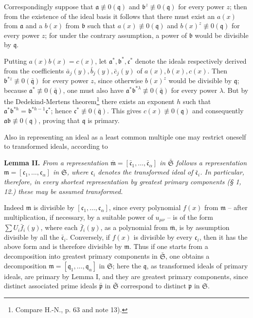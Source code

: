 \documentclass[11pt]{article}
\providecommand{\frakS}{\mathfrak S}
\providecommand{\frakm}{\mathfrak m}
\providecommand{\frakp}{\mathfrak p}
\providecommand{\frakq}{\mathfrak q}
\providecommand{\fraka}{\mathfrak a}
\providecommand{\frakb}{\mathfrak b}
\providecommand{\frakc}{\mathfrak c}
\providecommand{\barfrakm}{\overline{\mathfrak m}}
\providecommand{\fraka}{\mathfrak a}
\providecommand{\frakc}{\mathfrak c}
\providecommand{\frakp}{\mathfrak p}
\providecommand{\frakp}{\mathfrak p}
\providecommand{\frakq}{\mathfrak q}
\providecommand{\frakS}{\mathfrak S}
\begin{document}
Correspondingly suppose that $\fraka\not\equiv0(\frakq)$ and $\frakb^z\not\equiv0(\frakq)$ for every power $z$; then from the existence of the ideal basis it follows that there must exist an $a(x)$ from $\fraka$ and a $b(x)$ from $\frakb$ such that $a(x)\not\equiv0(\frakq)$ and $b(x)^z\not\equiv0(\frakq)$ for every power $z$; for under the contrary assumption, a power of $\frakb$ would be divisible by $\frakq$.

Putting $a(x)b(x)=c(x)$, let $\fraka^*,\frakb^*,\frakc^*$ denote the ideals respectively derived from the coefficients $\bar a_j(y),\bar b_j(y),\bar c_j(y)$ of $a(x),b(x),c(x)$. Then $\frakb^{*z}\not\equiv0(\bar{\frakq})$ for every power $z$, since otherwise $b(x)^z$ would be divisible by $\frakq$; because $\fraka^*\not\equiv0(\bar{\frakq})$, one must also have $\fraka^*\frakb^{*\lambda}\not\equiv0(\bar{\frakq})$ for every power $\lambda$. But by the Dedekind-Mertens theorem\footnote{Compare H.-N., p. 63 and note 13).} there exists an exponent $h$ such that $\fraka^*\frakb^{*h}=\frakb^{*h-1}\frakc^*$; hence $\frakc^*\not\equiv0(\bar{\frakq})$. This gives $c(x)\not\equiv0(\frakq)$ and consequently $\fraka\frakb\not\equiv0(\frakq)$, proving that $\frakq$ is primary.

Also in representing an ideal as a least common multiple one may restrict oneself to transformed ideals, according to

\textbf{Lemma II.} \emph{From a representation $\barfrakm=[\bar{\frakc}_1,\ldots,\bar{\frakc}_\alpha]$ in $\bar{\frakS}$ follows a representation $\frakm=[\frakc_1,\ldots,\frakc_\alpha]$ in $\frakS$, where $\frakc_i$ denotes the transformed ideal of $\bar{\frakc}_i$. In particular, therefore, in every shortest representation by greatest primary components (§ 1, 12.) these may be assumed transformed.}

Indeed $\frakm$ is divisible by $[\frakc_1,\ldots,\frakc_\alpha]$, since every polynomial $f(x)$ from $\frakm$ -- after multiplication, if necessary, by a suitable power of $u_{\mu\nu}$ -- is of the form $\sum U_i\bar f_i(y)$, where each $\bar f_i(y)$, as a polynomial from $\barfrakm$, is by assumption divisible by all the $\bar{\frakc}_i$. Conversely, if $f(x)$ is divisible by every $\frakc_i$, then it has the above form and is therefore divisible by $\frakm$. Thus if one starts from a decomposition into greatest primary components in $\bar{\frakS}$, one obtains a decomposition $\frakm=[\frakq_1,\ldots,\frakq_\alpha]$ in $\frakS$; here the $\frakq$, as transformed ideals of primary ideals, are primary by Lemma I, and they are greatest primary components, since distinct associated prime ideals $\bar{\frakp}$ in $\bar{\frakS}$ correspond to distinct $\frakp$ in $\frakS$.
\end{document}
